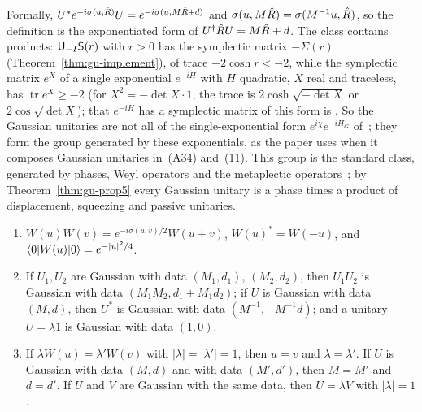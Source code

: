 \begin{veteenv}
Formally, $U^*e^{-i\sigma(u,\hat R)}U=e^{-i\sigma(u,M\hat R+d)}$ and $\sigma(u,M\hat R)=\sigma(M^{-1}u,\hat R)$, so the definition is the exponentiated
form of $U^\dagger\hat R U=M\hat R+d$. The class contains products: $\mathsf U_{-I}\mathsf S(r)$ with $r>0$ has the symplectic matrix $-\Sigma(r)$
(Theorem~\ref{thm:gu-implement}), of trace $-2\cosh r<-2$, while the symplectic matrix $e^X$ of a single exponential $e^{-iH}$ with
$H$ quadratic, $X$ real and traceless, has $\operatorname{tr}e^X\ge-2$ (for $X^2=-\det X\cdot1$, the trace is $2\cosh\sqrt{-\det X}$ or
$2\cos\sqrt{\det X}$); that $e^{-iH}$ has a symplectic matrix of this form is . So the Gaussian unitaries
are not all of the single-exponential form $e^{i\chi}e^{-iH_G}$ of~\cite[(1)]{tjoacirac}; they form the group generated by these
exponentials, as the paper uses when it composes Gaussian unitaries in~(A34) and~(11). This group is the standard class, generated
by phases, Weyl operators and the metaplectic operators~\cite[]{folland}; by Theorem~\ref{thm:gu-prop5} every Gaussian unitary
is a phase times a product of displacement, squeezing and passive unitaries.

\begin{proposition}\label{prop:gu-weyl}
\begin{enumerate}
\item[(a)] $W(u)W(v)=e^{-i\sigma(u,v)/2}W(u+v)$, $W(u)^*=W(-u)$, and $\langle0\rvert W(u)\lvert 0\rangle=e^{-\lvert u\rvert^2/4}$.
\item[(b)] If $U_1,U_2$ are Gaussian with data $(M_1,d_1)$, $(M_2,d_2)$, then $U_1U_2$ is Gaussian with data $(M_1M_2,d_1+M_1d_2)$;
if $U$ is Gaussian with data $(M,d)$, then $U^*$ is Gaussian with data $(M^{-1},-M^{-1}d)$; and a unitary $U=\lambda1$ is Gaussian
with data $(1,0)$.
\item[(c)] If $\lambda W(u)=\lambda'W(v)$ with $\lvert\lambda\rvert=\lvert\lambda'\rvert=1$, then $u=v$ and $\lambda=\lambda'$. If $U$ is Gaussian with
data $(M,d)$ and with data $(M',d')$, then $M=M'$ and $d=d'$. If $U$ and $V$ are Gaussian with the same data, then $U=\lambda V$ with
$\lvert\lambda\rvert=1$.
\end{enumerate}
\end{proposition}


\end{veteenv}
